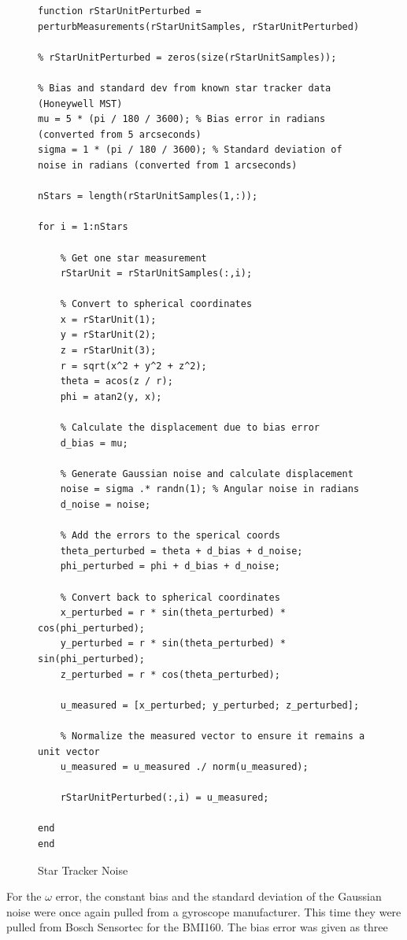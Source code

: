 \begin{figure} [H]
    \centering
    \begin{lstlisting}
function rStarUnitPerturbed = perturbMeasurements(rStarUnitSamples, rStarUnitPerturbed)

% rStarUnitPerturbed = zeros(size(rStarUnitSamples));

% Bias and standard dev from known star tracker data (Honeywell MST)
mu = 5 * (pi / 180 / 3600); % Bias error in radians (converted from 5 arcseconds)
sigma = 1 * (pi / 180 / 3600); % Standard deviation of noise in radians (converted from 1 arcseconds)

nStars = length(rStarUnitSamples(1,:));

for i = 1:nStars

    % Get one star measurement
    rStarUnit = rStarUnitSamples(:,i);

    % Convert to spherical coordinates
    x = rStarUnit(1);
    y = rStarUnit(2); 
    z = rStarUnit(3);
    r = sqrt(x^2 + y^2 + z^2);
    theta = acos(z / r);
    phi = atan2(y, x);
    
    % Calculate the displacement due to bias error
    d_bias = mu;
    
    % Generate Gaussian noise and calculate displacement
    noise = sigma .* randn(1); % Angular noise in radians
    d_noise = noise;
    
    % Add the errors to the sperical coords
    theta_perturbed = theta + d_bias + d_noise;
    phi_perturbed = phi + d_bias + d_noise;
    
    % Convert back to spherical coordinates
    x_perturbed = r * sin(theta_perturbed) * cos(phi_perturbed);
    y_perturbed = r * sin(theta_perturbed) * sin(phi_perturbed);
    z_perturbed = r * cos(theta_perturbed);
    
    u_measured = [x_perturbed; y_perturbed; z_perturbed];
    
    % Normalize the measured vector to ensure it remains a unit vector
    u_measured = u_measured ./ norm(u_measured);

    rStarUnitPerturbed(:,i) = u_measured;
    
end
end
    \end{lstlisting}
    \caption{Star Tracker Noise}
    \label{fig:starTrackerNoise}
\end{figure}

For the $\omega$ error, the constant bias and the standard deviation of the Gaussian noise were once again pulled from a gyroscope manufacturer. This time they were pulled from Bosch Sensortec for the BMI160. The bias error was given as three 

